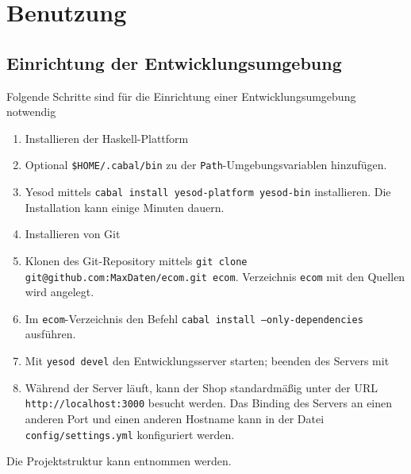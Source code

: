 \chapter{Benutzung}

\section{Einrichtung der Entwicklungsumgebung}
Folgende Schritte sind für die Einrichtung einer Entwicklungsumgebung notwendig

\begin{enumerate}
  \item Installieren der Haskell-Plattform \cite{HasP}
  \vspace*{-0.5em}
  \item Optional \texttt{\$HOME/.cabal/bin} zu der \texttt{Path}-Umgebungsvariablen hinzufügen.
  \vspace*{-0.5em}
  \item Yesod mittels \texttt{cabal install yesod-platform yesod-bin} installieren. Die Installation kann einige Minuten dauern. 
  \vspace*{-0.5em}
  \item Installieren von Git \cite{GitIn}
  \vspace*{-0.5em}
  \item Klonen des Git-Repository mittels \texttt{git clone git@github.com:MaxDaten/ecom.git ecom}. Verzeichnis \texttt{ecom} mit den Quellen wird angelegt.
  \vspace*{-0.5em}
  \item Im \texttt{ecom}-Verzeichnis den Befehl \texttt{cabal install --only-dependencies} ausführen.
  \vspace*{-1.5em} %
  \item Mit \texttt{yesod devel} den Entwicklungsserver starten; beenden des Servers mit \Enter
  \vspace*{-1.5em}
  \item Während der Server läuft, kann der Shop standardmäßig unter der URL \\ \texttt{http://localhost:3000} besucht werden. Das Binding des Servers an einen anderen Port und einen anderen Hostname kann in der Datei \texttt{config/settings.yml} konfiguriert werden.
\end{enumerate}

Die Projektstruktur kann  entnommen werden.

